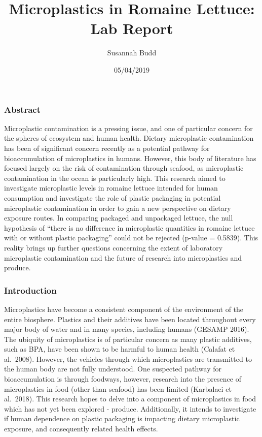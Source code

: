 \documentclass[]{article}
\title{Microplastics in Romaine Lettuce: Lab Report}
\author{Susannah Budd}
\date{05/04/2019}
\begin{document}
\maketitle

\hypertarget{abstract}{%
\subsubsection{Abstract}\label{abstract}}

Microplastic contamination is a pressing issue, and one of particular
concern for the spheres of ecosystem and human health. Dietary
microplastic contamination has been of significant concern recently as a
potential pathway for bioaccumulation of microplastics in humans.
However, this body of literature has focused largely on the risk of
contamination through seafood, as microplastic contamination in the
ocean is particularly high. This research aimed to investigate
microplastic levels in romaine lettuce intended for human consumption
and investigate the role of plastic packaging in potential microplastic
contamination in order to gain a new perspective on dietary exposure
routes. In comparing packaged and unpackaged lettuce, the null
hypothesis of ``there is no difference in microplastic quantities in
romaine lettuce with or without plastic packaging'' could not be
rejected (p-value = 0.5839). This reality brings up further questions
concerning the extent of laboratory microplastic contamination and the
future of research into microplastics and produce.

\hypertarget{introduction}{%
\subsubsection{Introduction}\label{introduction}}

Microplastics have become a consistent component of the environment of
the entire biosphere. Plastics and their additives have been located
throughout every major body of water and in many species, including
humans (GESAMP 2016). The ubiquity of microplastics is of particular
concern as many plastic additives, such as BPA, have been shown to be
harmful to human health (Calafat et al.~2008). However, the vehicles
through which microplastics are transmitted to the human body are not
fully understood. One suspected pathway for bioaccumulation is through
foodways, however, research into the presence of microplastics in food
(other than seafood) has been limited (Karbalaei et al.~2018). This
research hopes to delve into a component of microplastics in food which
has not yet been explored - produce. Additionally, it intends to
investigate if human dependence on plastic packaging is impacting
dietary microplastic exposure, and consequently related health effects.~
\end{document}
